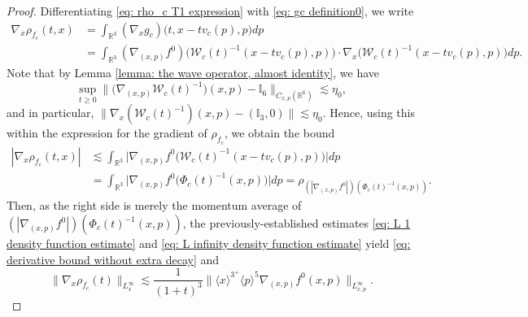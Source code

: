 \documentclass[reqno, 11pt, letterpaper]{amsart}
\theoremstyle{remark}
\numberwithin{equation}{section}
\numberwithin{theorem}{section}
\numberwithin{table}{section}
\numberwithin{figure}{section}
\begin{document}
\begin{proof}
Differentiating \eqref{eq: rho_c T1 expression} with \eqref{eq: gc definition0}, we write 
$$\begin{aligned}
\nabla_x\rho_{f_c}(t,x) 
&= \int_{\mathbb{R}^3} (\nabla_xg_c) \Big(t, x-tv_c(p),p \Big) dp\\
&= \int_{\mathbb{R}^3} (\nabla_{(x,p)}f^0) \Big(\mathcal{W}_c(t)^{-1}(x-tv_c(p),p) \Big)\cdot\nabla_x\Big(\mathcal{W}_c(t)^{-1}(x-tv_c(p),p)\Big) dp.
\end{aligned}$$
Note that by Lemma \ref{lemma:  the wave operator, almost identity}, we have
$$\sup_{t\geq 0}\Big\|\Big(\nabla_{(x,p)}\mathcal{W}_c(t)^{-1}\Big)(x,p)-\mathbb{I}_6\Big\|_{C_{x,p}(\mathbb{R}^6)}\lesssim\eta_0,$$
and in particular, $\|\nabla_x(\mathcal{W}_c(t)^{-1})(x,p)-(\mathbb{I}_3,0)\|\lesssim\eta_0$.  Hence, using this within the expression for the gradient of $\rho_{f_c}$, we obtain the bound 
$$\begin{aligned}
|\nabla_x\rho_{f_c}(t,x)|&\lesssim \int_{\mathbb{R}^3}\Big|\nabla_{(x,p)}f^0\Big(\mathcal{W}_c(t)^{-1}(x-tv_c(p),p)\Big) \Big| dp\\
&=\int_{\mathbb{R}^3}\Big|\nabla_{(x,p)}f^0\Big(\Phi_c(t)^{-1}(x,p)\Big) \Big|dp=\rho_{(|\nabla_{(x,p)}f^0|)(\Phi_c(t)^{-1}(x,p))}.
\end{aligned}$$
Then, as the right side is merely the momentum average of $(|\nabla_{(x,p)}f^0|)(\Phi_c(t)^{-1}(x,p))$, the previously-established estimates \eqref{eq: L 1 density function estimate} and \eqref{eq: L infinity density function estimate} yield  \eqref{eq: derivative bound without extra decay} and
\begin{equation}\label{eq: L infinity derivative bound without extra decay}
\|\nabla_x\rho_{f_c}(t)\|_{L_x^\infty}\lesssim\frac{1}{(1+t)^3}\Big\|\langle x\rangle^{3^+}\langle p\rangle^5\nabla_{(x,p)}f^0(x,p)\Big\|_{L_{x,p}^\infty}.
\end{equation}



\end{proof}
\end{document}
